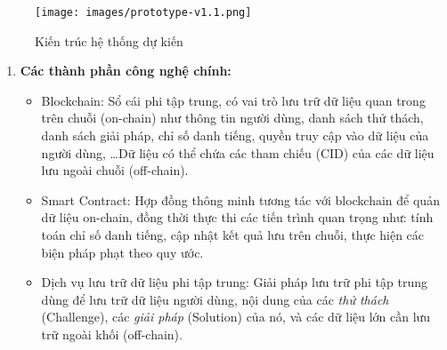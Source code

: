 \documentclass{article}[14pt]
\begin{document}
{            \begin{figure} [h!]
                \centering
                \texttt{[image: images/prototype-v1.1.png]}
                \caption{Kiến trúc hệ thống dự kiến}
                \label{fig:architect}
            \end{figure}

            \begin{enumerate}[label=\textbf{\alph*.}]
                \item \textbf{Các thành phần công nghệ chính:}
                \begin{itemize}
                    \item Blockchain: Sổ cái phi tập trung, có vai trò lưu trữ dữ liệu quan trong trên chuỗi (on-chain) như thông tin người dùng, danh sách thử thách, danh sách giải pháp, chỉ số danh tiếng, quyền truy cập vào dữ liệu của người dùng, \dots Dữ liệu có thể chứa các tham chiếu (CID) của các dữ liệu lưu ngoài chuỗi (off-chain). 
                    \item Smart Contract: Hợp đồng thông minh tương tác với blockchain để quản dữ liệu on-chain, đồng thời thực thi các tiến trình quan trọng như: tính toán chỉ số danh tiếng, cập nhật kết quả lưu trên chuỗi, thực hiện các biện pháp phạt theo quy ước. 
                    \item Dịch vụ lưu trữ dữ liệu phi tập trung: Giải pháp lưu trữ phi tập trung dùng để lưu trữ dữ liệu người dùng, nội dung của các \textit{thử thách} (Challenge), các \textit{giải pháp} (Solution) của nó, và các dữ liệu lớn cần lưu trữ ngoài khối (off-chain).
                \end{itemize}
                    

\end{enumerate}}
\end{document}
